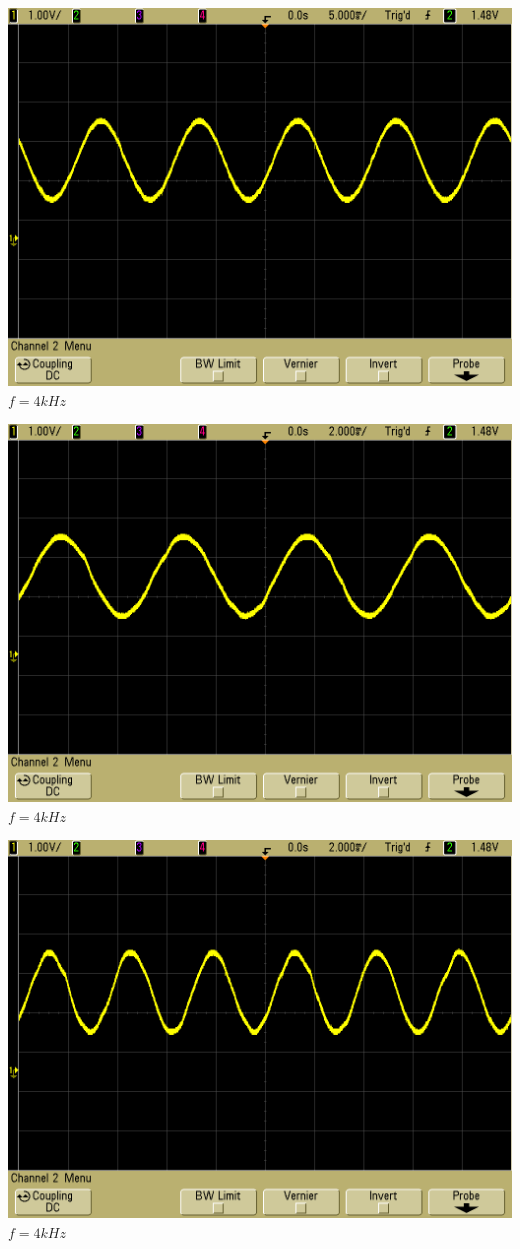 \documentclass[compress,11pt]{beamer}
\begin{document}
\begin{frame}\includegraphics[width=.7\textwidth]{../scope_66}\\
$f = 4 kHz$
\end{frame}

\begin{frame}\includegraphics[width=.7\textwidth]{../scope_67}\\
$f = 4 kHz$
\end{frame}

\begin{frame}\includegraphics[width=.7\textwidth]{../scope_68}\\
$f = 4 kHz$
\end{frame}
\end{document}
